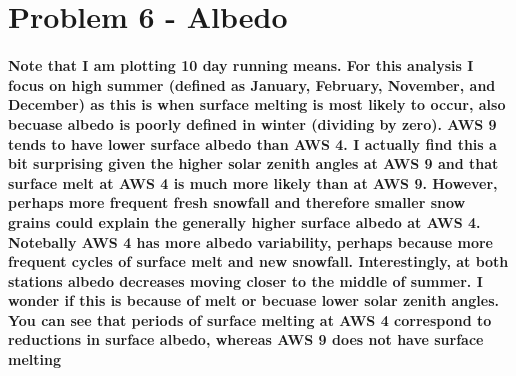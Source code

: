 \documentclass[11pt]{article}
\begin{document}
    \begin{center}
    \end{center}
    { \hspace*{\fill} \\}
    
    \begin{center}
    \end{center}
    { \hspace*{\fill} \\}
    
    \section{Problem 6 - Albedo}\label{problem-6---albedo}

\paragraph{Note that I am plotting 10 day running means. For this
analysis I focus on high summer (defined as January, February, November,
and December) as this is when surface melting is most likely to occur,
also becuase albedo is poorly defined in winter (dividing by zero). AWS
9 tends to have lower surface albedo than AWS 4. I actually find this a
bit surprising given the higher solar zenith angles at AWS 9 and that
surface melt at AWS 4 is much more likely than at AWS 9. However,
perhaps more frequent fresh snowfall and therefore smaller snow grains
could explain the generally higher surface albedo at AWS 4. Notebally
AWS 4 has more albedo variability, perhaps because more frequent cycles
of surface melt and new snowfall. Interestingly, at both stations albedo
decreases moving closer to the middle of summer. I wonder if this is
because of melt or becuase lower solar zenith angles. You can see that
periods of surface melting at AWS 4 correspond to reductions in surface
albedo, whereas AWS 9 does not have surface
melting}\label{note-that-i-am-plotting-10-day-running-means.-for-this-analysis-i-focus-on-high-summer-defined-as-january-february-november-and-december-as-this-is-when-surface-melting-is-most-likely-to-occur-also-becuase-albedo-is-poorly-defined-in-winter-dividing-by-zero.-aws-9-tends-to-have-lower-surface-albedo-than-aws-4.-i-actually-find-this-a-bit-surprising-given-the-higher-solar-zenith-angles-at-aws-9-and-that-surface-melt-at-aws-4-is-much-more-likely-than-at-aws-9.-however-perhaps-more-frequent-fresh-snowfall-and-therefore-smaller-snow-grains-could-explain-the-generally-higher-surface-albedo-at-aws-4.-notebally-aws-4-has-more-albedo-variability-perhaps-because-more-frequent-cycles-of-surface-melt-and-new-snowfall.-interestingly-at-both-stations-albedo-decreases-moving-closer-to-the-middle-of-summer.-i-wonder-if-this-is-because-of-melt-or-becuase-lower-solar-zenith-angles.-you-can-see-that-periods-of-surface-melting-at-aws-4-correspond-to-reductions-in-surface-albedo-whereas-aws-9-does-not-have-surface-melting}
\end{document}
